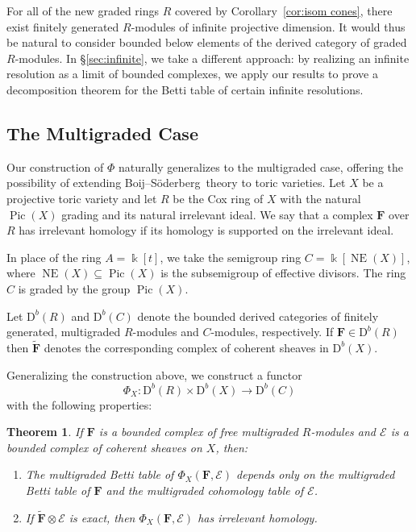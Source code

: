 \documentclass[12pt]{amsart}
\newtheorem{theorem}[lemma]{Theorem}
\theoremstyle{definition}
\theoremstyle{remark}
\newcommand{\Pic}{\operatorname{Pic}}
\newcommand{\NE}{\operatorname{NE}}
\newcommand{\kk}{\Bbbk}
\newcommand{\PP}{\mathbb{P}}
\newcommand{\cO}{\mathcal{O}}
\newcommand{\cE}{\mathcal{E}}
\newcommand{\FF}{\mathbf{F}}
\newcommand{\defi}[1]{\textsf{#1}} %
\newcommand{\DD}{\mathrm{D}}
\def\BS{Boij--S\"oderberg~}
\begin{document}

For all of the new graded rings $R$ covered by Corollary~\ref{cor:isom cones}, there exist finitely generated $R$-modules of infinite projective dimension.  It would thus be natural to consider bounded below elements of the derived category of graded $R$-modules.  In \S\ref{sec:infinite}, we take a different approach: by realizing an infinite resolution as a limit of bounded complexes, we apply our results to prove a decomposition theorem for the Betti table of certain infinite resolutions.

\subsection*{The Multigraded Case}
Our construction of $\Phi$ naturally generalizes to the multigraded case, offering the possibility of extending \BS theory to toric varieties.  Let $X$ be a projective toric variety and let $R$ be the Cox ring of $X$ with the natural $\Pic(X)$ grading and its natural irrelevant ideal. We say that a complex $\FF$ over $R$ has \defi{irrelevant homology} if its homology is supported on the irrelevant ideal.

In place of the ring $A=\kk[t]$, we take the semigroup ring $C=\kk[\NE(X)]$, where $\NE(X)\subseteq \Pic(X)$ is the subsemigroup of effective divisors.  %
The ring $C$ is graded by the group $\Pic(X)$.

Let $\DD^b(R)$ and $\DD^b(C)$ denote the bounded derived categories of finitely generated, multigraded $R$-modules and $C$-modules, respectively.   
If $\FF\in \DD^b(R)$ then $\widetilde{\FF}$  denotes the corresponding complex of coherent sheaves in $\DD^b(X)$.  


Generalizing the construction above, we construct a functor
\[
\Phi_{X}: \DD^b(R)\times \DD^b(X)\to \DD^b(C)
\]
with the following properties:
\begin{theorem}\label{thm:Phimulti}
If $\FF$ is a bounded complex of free multigraded $R$-modules and $\cE$ is a bounded complex of coherent sheaves on $X$, then:
\begin{enumerate} 
	\item\label{thm:Phi':1}  The multigraded Betti table of $\Phi_{X}(\FF,\cE)$ depends only on the multigraded Betti table of $\FF$ and the multigraded cohomology table of $\cE$.
	\item\label{thm:Phi':2}  If $\widetilde{\FF}\otimes \cE$ is exact, then $\Phi_{X}(\FF,\cE)$ has irrelevant homology.  
\end{enumerate}
\end{theorem}
\end{document}
